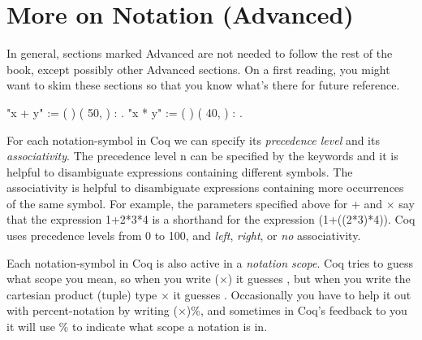\documentclass[12pt]{report}
\begin{document}
\section{More on Notation (Advanced)}



 In general, sections marked Advanced are not needed to follow the
    rest of the book, except possibly other Advanced sections.  On a
    first reading, you might want to skim these sections so that you
    know what's there for future reference. \begin{coqdoccode}
\coqdocemptyline
\coqdocnoindent
{} "x + y" := (  )  \coqdoceol
\coqdocindent{11.50em}
(  50,  ) \coqdoceol
\coqdocindent{11.50em}
: .\coqdoceol
\coqdocnoindent
{} "x * y" := (  )  \coqdoceol
\coqdocindent{11.50em}
(  40,  ) \coqdoceol
\coqdocindent{11.50em}
: .\coqdoceol
\coqdocemptyline
\end{coqdoccode}
For each notation-symbol in Coq we can specify its \textit{precedence level}
    and its \textit{associativity}. The precedence level n can be specified by the
    keywords    and it is helpful to disambiguate
    expressions containing different symbols. The associativity is helpful
    to disambiguate expressions containing more occurrences of the same 
    symbol. For example, the parameters specified above for + and \ensuremath{\times}
    say that the expression 1+2*3*4 is a shorthand for the expression
    (1+((2*3)*4)). Coq uses precedence levels from 0 to 100, and 
    \textit{left}, \textit{right}, or \textit{no} associativity.


    Each notation-symbol in Coq is also active in a \textit{notation scope}.  
    Coq tries to guess what scope you mean, so when you write (\ensuremath{\times}) 
    it guesses , but when you write the cartesian
    product (tuple) type \ensuremath{\times} it guesses .
    Occasionally you have to help it out with percent-notation by
    writing (\ensuremath{\times})\%, and sometimes in Coq's feedback to you it
    will use \% to indicate what scope a notation is in.
\end{document}
